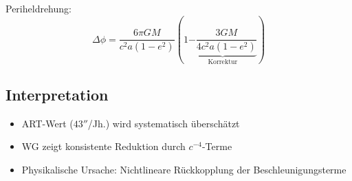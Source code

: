 Periheldrehung:
\begin{equation}
\Delta\phi = \frac{6\pi GM}{c^2a(1-e^2)}\left(1 \underbrace{- \frac{3GM}{4c^2a(1-e^2)}}_{\text{Korrektur}}\right)
\end{equation}

\subsection{Interpretation}
\begin{itemize}
\item ART-Wert ($43''$/Jh.) wird systematisch überschätzt
\item WG zeigt konsistente Reduktion durch $c^{-4}$-Terme
\item Physikalische Ursache: Nichtlineare Rückkopplung der Beschleunigungsterme
\end{itemize}
